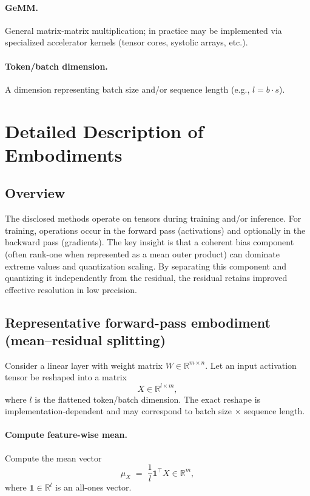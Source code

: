 \documentclass[11pt]{article}
\begin{document}
\paragraph{GeMM.}
General matrix-matrix multiplication; in practice may be implemented via specialized accelerator kernels (tensor cores, systolic arrays, etc.).

\paragraph{Token/batch dimension.}
A dimension representing batch size and/or sequence length (e.g., $l=b\cdot s$).

\section{Detailed Description of Embodiments}

\subsection{Overview}
The disclosed methods operate on tensors during training and/or inference. For training, operations occur in the forward pass (activations) and optionally in the backward pass (gradients). The key insight is that a coherent bias component (often rank-one when represented as a mean outer product) can dominate extreme values and quantization scaling. By separating this component and quantizing it independently from the residual, the residual retains improved effective resolution in low precision.

\subsection{Representative forward-pass embodiment (mean--residual splitting)}
Consider a linear layer with weight matrix $W\in\mathbb{R}^{m\times n}$. Let an input activation tensor be reshaped into a matrix
\[
X \in \mathbb{R}^{l\times m},
\]
where $l$ is the flattened token/batch dimension. The exact reshape is implementation-dependent and may correspond to batch size $\times$ sequence length.

\paragraph{Compute feature-wise mean.}
Compute the mean vector
\[
\mu_X \;=\; \frac{1}{l}\bm{1}^\top X \in \mathbb{R}^{m},
\]
where $\bm{1}\in\mathbb{R}^{l}$ is an all-ones vector.
\end{document}
